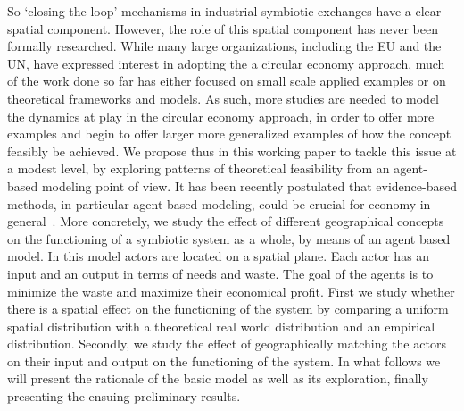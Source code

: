 \documentclass[fleqn,10pt]{wlscirep}
\begin{document}
So `closing the loop' mechanisms in industrial symbiotic exchanges have a clear spatial component. However, the role of this spatial component has never been formally researched. While many large organizations, including the EU and the UN, have expressed interest in adopting the a circular economy approach, much of the work done so far has either focused on small scale applied examples or on theoretical frameworks and models. As such, more studies are needed to model the dynamics at play in the circular economy approach, in order to offer more examples and begin to offer larger more generalized examples of how the concept feasibly be achieved. We propose thus in this working paper to tackle this issue at a modest level, by exploring patterns of theoretical feasibility from an agent-based modeling point of view. It has been recently postulated that evidence-based methods, in particular agent-based modeling, could be crucial for economy in general~\cite{farmer2009economy}. More concretely, we study the effect of different geographical concepts on the functioning of a symbiotic system as a whole, by means of an agent based model. In this model actors are located on a spatial plane. Each actor has an input and an output in terms of needs and waste. The goal of the agents is to minimize the waste and maximize their economical profit. First we study whether there is a spatial effect on the functioning of the system by comparing a uniform spatial distribution with a theoretical real world distribution and an empirical distribution. Secondly, we study the effect of geographically matching the actors on their input and output on the functioning of the system. In what follows we will present the rationale of the basic model as well as its exploration, finally presenting the ensuing preliminary results.  


  

\end{document}
